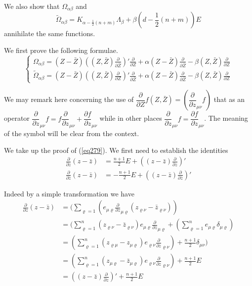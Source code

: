   We also show that $\Omega_{\alpha \beta}$ and  
  \begin{equation*}
\tilde{\Omega}_{\alpha \beta}=K_{\alpha -
  \frac{1}{2}(n+m)}\Lambda_\beta + \beta (d - \frac{1}{2}(n+m))E
\tag{278}\label{eq278}   
  \end{equation*}  
  annihilate the same functions.
  
  We first prove the following formulae.
  \begin{equation*}
\begin{cases}
\Omega_{\alpha \beta}=(Z-\bar{Z})((Z,\bar{Z})\frac{\partial}{\partial
  \bar{Z}})'\frac{\partial}{\partial Z}+ \alpha
(Z-\bar{Z})\frac{\partial}{\partial \bar{Z}}-\beta
(Z,\bar{Z})\frac{\partial}{\partial Z}\\ 
\tilde{\Omega}_{\alpha
  \beta}=(Z-\bar{Z})((Z,\bar{Z})\frac{\partial}{\partial
  Z})'\frac{\partial}{\partial \bar{Z}}+ \alpha
(Z-\bar{Z})\frac{\partial}{\partial \bar{Z}}-\beta
(Z,\bar{Z})\frac{\partial}{\partial Z} \tag{279}\label{eq279}   
\end{cases}
  \end{equation*}
  
  We may remark here concerning the use of $\dfrac{\partial}{\partial
    Z}f(Z,\bar{Z})=(\dfrac{\partial}{\partial z}_{\mu \nu}f)$ that as
  an operator $\dfrac{\partial}{\partial z}_{\mu \nu}f=f
  \dfrac{\partial}{\partial z}_{\mu \nu}+\dfrac{\partial f}{\partial
    z}_{\mu \nu}$ while in other places $\dfrac{\partial}{\partial
    z}_{\mu \nu}f=\dfrac{\partial f}{\partial z}_{\mu \nu}$. The
  meaning of the symbol will be clear from the context. 
  
  We take up the proof of (\ref{eq279}). We first need to establish the
  identities 
  \begin{align*}
\frac{\partial}{\partial z}(z-\bar{z}) & = \frac{n+1}{2}E
+((z-\bar{z})\frac{\partial}{\partial z})'\\ 
\frac{\partial}{\partial \bar{z}}(z-\bar{z}) & = -\frac{n+1}{2}E
+((z-\bar{z})\frac{\partial}{\partial \bar{z}})' \tag{280}\label{eq280}   
  \end{align*}  

  Indeed by a simple transformation we have
  \begin{align*}
\frac{\partial}{\partial z}(z - \bar{z}) & = (\sum_{\varrho =1}(e_{\mu
  \varrho}\frac{\partial}{\partial z}_{\mu \varrho}(z_{\varrho
  \nu}-\bar{z}_{\varrho \nu}))\\ 
& = (\sum^n_{\varrho =1}(z_{\varrho \nu}-\bar{z}_{\varrho \nu})e_{\mu
  \varrho}\frac{\partial}{\partial z}_{\mu
  \varrho}+(\sum^n_{\varrho=1}e_{\mu \varrho} \delta_{\mu \varrho})\\ 
& = (\sum^n_{\varrho =1}(z_{ \varrho \mu}-z_{\mu \varrho })e_{\varrho
  \nu }\frac{\partial}{\partial z}_{\varrho \nu })+ \frac{n+1}{2}
\delta_{\mu \nu})\\ 
& = (\sum^n_{\varrho =1}(z_{ \mu \varrho}-\bar{z}_{\mu \varrho
})e_{\varrho \nu }\frac{\partial}{\partial z}_{\varrho \nu })+
\frac{n+1}{2} E\\ 
& = ((z-\bar{z})\frac{\partial}{\partial z})'+\frac{n+1}{2}E
\end{align*}\pageoriginale  


